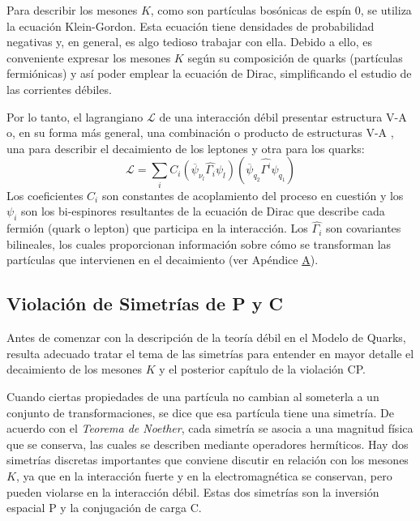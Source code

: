 Para describir los mesones $K$, como son partículas bosónicas de espín 0, se utiliza la ecuación Klein-Gordon. Esta ecuación tiene densidades de probabilidad negativas y, en general, es algo tedioso trabajar con ella. Debido a ello, es conveniente expresar los mesones $K$ según su composición de quarks (partículas fermiónicas) y así poder emplear la ecuación de Dirac, simplificando el estudio de las corrientes débiles.

Por lo tanto, el lagrangiano $\mathcal{L}$ de una interacción débil presentar estructura V-A o, en su forma más general, una combinación o producto de estructuras V-A \cite{Renton}, una para describir el decaimiento de los leptones y otra para los quarks:
\begin{equation}
\mathcal{L}= \sum _{i} C_{i}\left( \overline{\psi}_{\nu_l}\widehat{\Gamma_{i}}\psi _{l}\right)\left( \overline{\psi }_{q_2}\widehat{\Gamma^{i}}\psi _{q_1}\right)
\end{equation}
Los coeficientes $C_i$ son constantes de acoplamiento del proceso en cuestión y los $\psi_i$ son los bi-espinores resultantes de la ecuación de Dirac que describe cada fermión (quark o lepton) que participa en la interacción. Los $\widehat{\Gamma_{i}}$ son covariantes bilineales, los cuales proporcionan información sobre cómo se transforman las partículas que intervienen en el decaimiento (ver Apéndice \hyperref[cap:A]{A}).

\subsection{Violación de Simetrías de P y C}\label{sec:symmetry}
Antes de comenzar con la descripción de la teoría débil en el Modelo de Quarks, resulta adecuado tratar el tema de las simetrías para entender en mayor detalle el decaimiento de los mesones $K$ y el posterior capítulo de la violación CP.

Cuando ciertas propiedades de una partícula no cambian al someterla a un conjunto de transformaciones, se dice que esa partícula tiene una simetría. De acuerdo con el \textit{Teorema de Noether}, cada simetría se asocia a una magnitud física que se conserva, las cuales se describen mediante operadores hermíticos. Hay dos simetrías discretas importantes que conviene discutir en relación con los mesones $K$, ya que en la interacción fuerte y en la electromagnética se conservan, pero pueden violarse en la interacción débil. Estas dos simetrías son la inversión espacial P y la conjugación de carga C.

